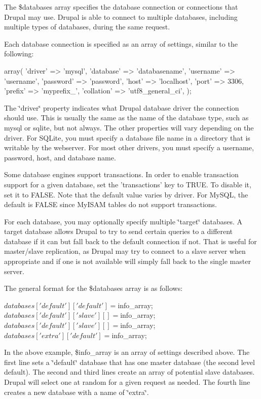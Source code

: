 The \$databases array specifies the database connection or connections that Drupal may use. Drupal is able to connect to multiple databases, including multiple types of databases, during the same request.

Each database connection is specified as an array of settings, similar to the following: 
\begin{DoxyCode}
 array(
   'driver' => 'mysql',
   'database' => 'databasename',
   'username' => 'username',
   'password' => 'password',
   'host' => 'localhost',
   'port' => 3306,
   'prefix' => 'myprefix_',
   'collation' => 'utf8_general_ci',
 );
\end{DoxyCode}


The \char`\"{}driver\char`\"{} property indicates what Drupal database driver the connection should use. This is usually the same as the name of the database type, such as mysql or sqlite, but not always. The other properties will vary depending on the driver. For SQLite, you must specify a database file name in a directory that is writable by the webserver. For most other drivers, you must specify a username, password, host, and database name.

Some database engines support transactions. In order to enable transaction support for a given database, set the 'transactions' key to TRUE. To disable it, set it to FALSE. Note that the default value varies by driver. For MySQL, the default is FALSE since MyISAM tables do not support transactions.

For each database, you may optionally specify multiple \char`\"{}target\char`\"{} databases. A target database allows Drupal to try to send certain queries to a different database if it can but fall back to the default connection if not. That is useful for master/slave replication, as Drupal may try to connect to a slave server when appropriate and if one is not available will simply fall back to the single master server.

The general format for the \$databases array is as follows: 
\begin{DoxyCode}
 $databases['default']['default'] = $info_array;
 $databases['default']['slave'][] = $info_array;
 $databases['default']['slave'][] = $info_array;
 $databases['extra']['default'] = $info_array;
\end{DoxyCode}


In the above example, \$info\_\-array is an array of settings described above. The first line sets a \char`\"{}default\char`\"{} database that has one master database (the second level default). The second and third lines create an array of potential slave databases. Drupal will select one at random for a given request as needed. The fourth line creates a new database with a name of \char`\"{}extra\char`\"{}.

